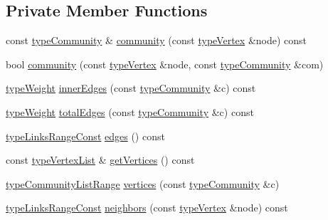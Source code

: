 \subsection*{Private Member Functions}
\begin{DoxyCompactItemize}
\item 
const \hyperlink{graphUndirectedGroupable_8h_a914da95c9ea7f14f4b7f875c36818556}{type\+Community} \& \hyperlink{classAlgorithmLouvain_a5f59777e27ab7a3e5accbc1f52b0e51e}{community} (const \hyperlink{edge_8h_a5fbd20c46956d479cb10afc9855223f6}{type\+Vertex} \&node) const
\item 
bool \hyperlink{classAlgorithmLouvain_a12549c842a87a6f9380ee8226ac58cf8}{community} (const \hyperlink{edge_8h_a5fbd20c46956d479cb10afc9855223f6}{type\+Vertex} \&node, const \hyperlink{graphUndirectedGroupable_8h_a914da95c9ea7f14f4b7f875c36818556}{type\+Community} \&com)
\item 
\hyperlink{edge_8h_a2e7ea3be891ac8b52f749ec73fee6dd2}{type\+Weight} \hyperlink{classAlgorithmLouvain_a066612d0b1d64d8f5c7d84f20bbf70c4}{inner\+Edges} (const \hyperlink{graphUndirectedGroupable_8h_a914da95c9ea7f14f4b7f875c36818556}{type\+Community} \&c) const
\item 
\hyperlink{edge_8h_a2e7ea3be891ac8b52f749ec73fee6dd2}{type\+Weight} \hyperlink{classAlgorithmLouvain_a36a6536611d7c97d16f93245e2271867}{total\+Edges} (const \hyperlink{graphUndirectedGroupable_8h_a914da95c9ea7f14f4b7f875c36818556}{type\+Community} \&c) const
\item 
\hyperlink{graphInterface_8h_ae8d27008f15586bbf419af7ad2e0a48a}{type\+Links\+Range\+Const} \hyperlink{classAlgorithmLouvain_a6d5f1cfcbe2581bbe7bbe285392e0bdf}{edges} () const
\item 
const \hyperlink{graphInterface_8h_a21d54d8a139def524d3b0d6f71ec4974}{type\+Vertex\+List} \& \hyperlink{classAlgorithmLouvain_a627618ba516be4f4906143b6b0ff1c77}{get\+Vertices} () const
\item 
\hyperlink{graphUndirectedGroupable_8h_ad440de7f8b59665f0705cc6f745aab09}{type\+Community\+List\+Range} \hyperlink{classAlgorithmLouvain_a24c9f6d44d422eee2307c55540a8273c}{vertices} (const \hyperlink{graphUndirectedGroupable_8h_a914da95c9ea7f14f4b7f875c36818556}{type\+Community} \&c)
\item 
\hyperlink{graphInterface_8h_ae8d27008f15586bbf419af7ad2e0a48a}{type\+Links\+Range\+Const} \hyperlink{classAlgorithmLouvain_a46c54a194acf1a09debfaf3f67d84f85}{neighbors} (const \hyperlink{edge_8h_a5fbd20c46956d479cb10afc9855223f6}{type\+Vertex} \&node) const

\end{DoxyCompactItemize}
